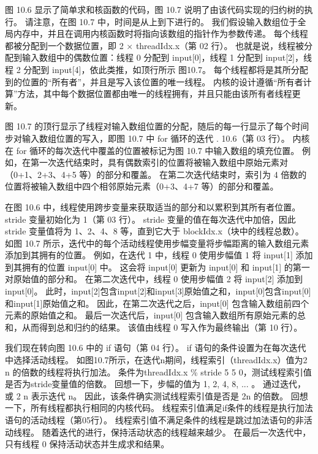 图 10.6 显示了简单求和核函数的代码，图 10.7 说明了由该代码实现的归约树的执行。 请注意，在图 10.7 中，时间是从上到下进行的。 我们假设输入数组位于全局内存中，并且在调用内核函数时将指向该数组的指针作为参数传递。 每个线程都被分配到一个数据位置，即 2 × threadIdx.x（第 02 行）。 也就是说，线程被分配到输入数组中的偶数位置：线程 0 分配到 input[0]，线程 1 分配到 input[2]，线程 2 分配到 input[4]，依此类推，如顶行所示 图10.7。 每个线程都将是其所分配到的位置的“所有者”，并且是写入该位置的唯一线程。 内核的设计遵循“所有者计算”方法，其中每个数据位置都由唯一的线程拥有，并且只能由该所有者线程更新。

图 10.7 的顶行显示了线程对输入数组位置的分配，随后的每一行显示了每个时间步对输入数组位置的写入，即图 10.7 中 for 循环的迭代 . 10.6（第 03 行）。 内核在 for 循环的每次迭代中覆盖的位置被标记为图 10.7 中输入数组的填充位置。 例如，在第一次迭代结束时，具有偶数索引的位置将被输入数组中原始元素对（0+1、2+3、4+5 等）的部分和覆盖。 在第二次迭代结束时，索引为 4 倍数的位置将被输入数组中四个相邻原始元素（0+3、4+7 等）的部分和覆盖。

在图 10.6 中，线程使用跨步变量来获取适当的部分和以累积到其所有者位置。 stride 变量初始化为 1（第 03 行）。 stride 变量的值在每次迭代中加倍，因此 stride 变量值将为 1、2、4、8 等，直到它大于 blockIdx.x（块中的线程总数）。 如图 10.7 所示，迭代中的每个活动线程使用步幅变量将步幅距离的输入数组元素添加到其拥有的位置。 例如，在迭代 1 中，线程 0 使用步幅值 1 将 input[1] 添加到其拥有的位置 input[0] 中。 这会将 input[0] 更新为 input[0] 和 input[1] 的第一对原始值的部分和。 在第二次迭代中，线程 0 使用步幅值 2 将 input[2] 添加到 input[0]。 此时，input[2]包含input[2]和input[3]原始值之和，input[0]包含input[0]和input[1]原始值之和。 因此，在第二次迭代之后，input[0] 包含输入数组前四个元素的原始值之和。 最后一次迭代后，input[0] 包含输入数组所有原始元素的总和，从而得到总和归约的结果。 该值由线程 0 写入作为最终输出（第 10 行）。

我们现在转向图 10.6 中的 if 语句（第 04 行）。 if 语句的条件设置为在每次迭代中选择活动线程。 如图10.7所示，在迭代n期间，线程索引（threadIdx.x）值为2 n 的倍数的线程将执行加法。 条件为threadIdx.x \% stride 5 5 0，测试线程索引值是否为stride变量值的倍数。 回想一下，步幅的值为 1, 2, 4, 8, ... 。 通过迭代，或 2 n 表示迭代 n。 因此，该条件确实测试线程索引值是否是 2n 的倍数。 回想一下，所有线程都执行相同的内核代码。 线程索引值满足if条件的线程是执行加法语句的活动线程（第05行）。 线程索引值不满足条件的线程是跳过加法语句的非活动线程。 随着迭代的进行，保持活动状态的线程越来越少。 在最后一次迭代中，只有线程 0 保持活动状态并生成求和结果。


